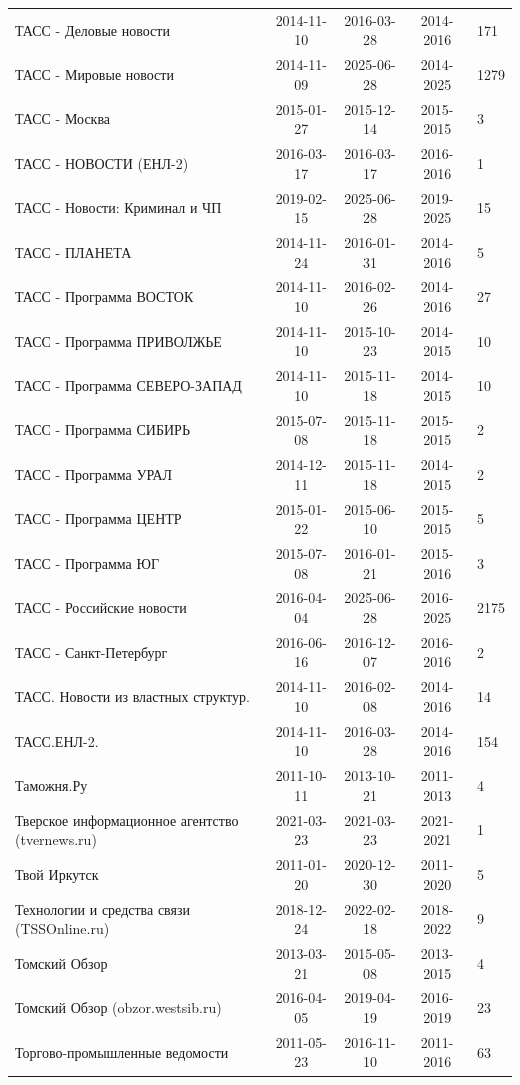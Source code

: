 \begin{longtable}{p{6cm}cccp{2cm}}
ТАСС - Деловые новости & 2014-11-10 & 2016-03-28 & 2014-2016 & 171\\
ТАСС - Мировые новости & 2014-11-09 & 2025-06-28 & 2014-2025 & 1279\\
ТАСС - Москва & 2015-01-27 & 2015-12-14 & 2015-2015 & 3\\
ТАСС - НОВОСТИ (ЕНЛ-2) & 2016-03-17 & 2016-03-17 & 2016-2016 & 1\\
ТАСС - Новости: Криминал и ЧП & 2019-02-15 & 2025-06-28 & 2019-2025 & 15\\
ТАСС - ПЛАНЕТА & 2014-11-24 & 2016-01-31 & 2014-2016 & 5\\
ТАСС - Программа ВОСТОК & 2014-11-10 & 2016-02-26 & 2014-2016 & 27\\
ТАСС - Программа ПРИВОЛЖЬЕ & 2014-11-10 & 2015-10-23 & 2014-2015 & 10\\
ТАСС - Программа СЕВЕРО-ЗАПАД & 2014-11-10 & 2015-11-18 & 2014-2015 & 10\\
ТАСС - Программа СИБИРЬ & 2015-07-08 & 2015-11-18 & 2015-2015 & 2\\
ТАСС - Программа УРАЛ & 2014-12-11 & 2015-11-18 & 2014-2015 & 2\\
ТАСС - Программа ЦЕНТР & 2015-01-22 & 2015-06-10 & 2015-2015 & 5\\
ТАСС - Программа ЮГ & 2015-07-08 & 2016-01-21 & 2015-2016 & 3\\
ТАСС - Российские новости & 2016-04-04 & 2025-06-28 & 2016-2025 & 2175\\
ТАСС - Санкт-Петербург & 2016-06-16 & 2016-12-07 & 2016-2016 & 2\\
ТАСС. Новости из властных структур. & 2014-11-10 & 2016-02-08 & 2014-2016 & 14\\
ТАСС.ЕНЛ-2. & 2014-11-10 & 2016-03-28 & 2014-2016 & 154\\
Таможня.Ру & 2011-10-11 & 2013-10-21 & 2011-2013 & 4\\
Тверское информационное агентство (tvernews.ru) & 2021-03-23 & 2021-03-23 & 2021-2021 & 1\\
Твой Иркутск & 2011-01-20 & 2020-12-30 & 2011-2020 & 5\\
Технологии и средства связи (TSSOnline.ru) & 2018-12-24 & 2022-02-18 & 2018-2022 & 9\\
Томский Обзор & 2013-03-21 & 2015-05-08 & 2013-2015 & 4\\
Томский Обзор (obzor.westsib.ru) & 2016-04-05 & 2019-04-19 & 2016-2019 & 23\\
Торгово-промышленные ведомости & 2011-05-23 & 2016-11-10 & 2011-2016 & 63\\

\end{longtable}
